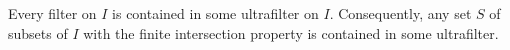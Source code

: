 Every filter on $I$ is contained in some ultrafilter on $I$. Consequently, any set $S$ of subsets of $I$ with the finite intersection property is contained in some ultrafilter.
